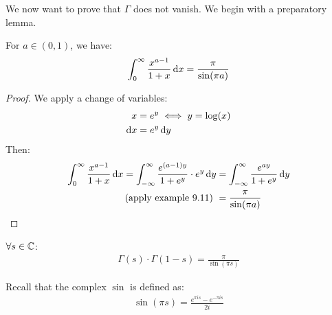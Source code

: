 We now want to prove that $\Gamma$ does not vanish. We begin with a preparatory lemma.

\begin{lemma}
For $a \in (0,1)$, we have:
\begin{align*}
    \int_0^\infty \frac{x^{a-1}}{1+x}\dif x = \frac{\pi}{\sin(\pi a)}
\end{align*}
\end{lemma}


\begin{proof}
We apply a change of variables:
\begin{align*}
    x &= e^y \iff y = \log(x)\\
    \dif x &= e^y \dif y
\end{align*}
Then:
\begin{align*}
    \int_0^\infty \frac{x^{a-1}}{1+x} \dif x = \int_{- \infty}^\infty \frac{e^{(a-1)y}}{1+e^y}\cdot e^y \dif y &= \int_{-\infty }^\infty \frac{e^{ay}}{1+e^y} \dif y\\
     \text{(apply example 9.11) } &= \frac{\pi}{\sin(\pi a)}
\end{align*}
\end{proof}

\begin{theorem}
$\forall s \in \mathbb{C}$: 
\begin{align*}
\Gamma(s) \cdot \Gamma(1-s) = \frac{\pi}{\sin(\pi s)}
\end{align*}

\end{theorem}

\begin{note}
Recall that the complex $\sin$ is defined as:
\begin{align*}
    \sin(\pi s) = \frac{e^{\pi i s} - e^{- \pi i s}}{2i}
\end{align*}
\end{note}

